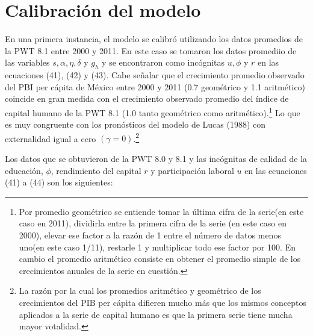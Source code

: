 \documentclass[12pt,notitlepage]{report}
\begin{document}
	\chapter{Calibración del modelo}
	\addtocounter{footnote}{17}
	En una primera instancia, el modelo se calibró utilizando los datos promedios de la PWT 8.1 entre 2000 y 2011. En este caso se tomaron los datos promediio de las variables $s, \alpha,\eta, \delta$ y $g_h$ y se encontraron como incógnitas $u, \phi$ y $r$ en las ecuaciones (41), (42) y (43). Cabe señalar que el crecimiento promedio observado del PBI per cápita de México entre 2000 y 2011 (0.7 geométrico y 1.1 aritmético) coincide en gran medida con el crecimiento observado promedio del índice de capital humano de la PWT 8.1 (1.0 tanto geométrico como aritmético).\footnote{Por promedio geométrico se entiende tomar la última cifra de la serie(en este caso en 2011), dividirla entre la primera cifra de la serie (en este caso en 2000), elevar ese factor a la razón de 1 entre el número de datos menos uno(en este caso 1/11), restarle 1 y multiplicar todo ese factor por 100. En cambio el promedio aritmético consiste en obtener el promedio simple de los crecimientos anuales de la serie en cuestión.} Lo que es muy congruente con los pronósticos del modelo de Lucas (1988) con externalidad igual a cero $(\gamma=0)$.\footnote{La razón por la cual los promedios aritmético y geométrico de los crecimientos del PIB per cápita difieren mucho más que los mismos conceptos aplicados a la serie de capital humano es que la primera serie tiene mucha mayor votalidad.}
	
	Los datos que se obtuvieron de la PWT 8.0 y 8.1 y las incógnitas de calidad de la educación, $\phi$, rendimiento del capital $r$ y participación laboral $u$ en las ecuaciones (41) a (44) son los siguientes:
	\newpage
	
\end{document}
